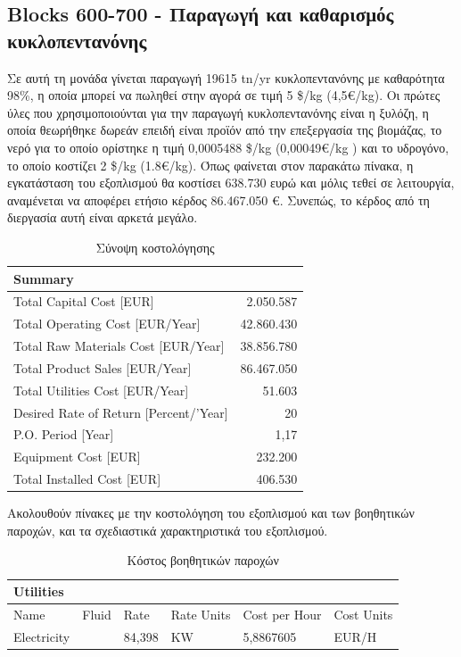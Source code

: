 \documentclass[11pt]{article}
\begin{document}
\subsection{Blocks 600-700 - Παραγωγή και καθαρισμός κυκλοπεντανόνης}
\label{sec:orgf728b70}
Σε αυτή τη μονάδα γίνεται παραγωγή 19615 tn/yr κυκλοπεντανόνης με
καθαρότητα 98\%, η οποία μπορεί να πωληθεί στην αγορά σε τιμή 5 \$/kg
(4,5€/kg). Οι πρώτες ύλες που χρησιμοποιούνται για την παραγωγή
κυκλοπεντανόνης είναι η ξυλόζη, η οποία θεωρήθηκε δωρεάν επειδή είναι
προϊόν από την επεξεργασία της βιομάζας, το νερό για το οποίο ορίστηκε η
τιμή 0,0005488 \$/kg (0,00049€/kg ) και το υδρογόνο, το οποίο κοστίζει 2
\$/kg (1.8€/kg). Όπως φαίνεται στον παρακάτω πίνακα, η εγκατάσταση του
εξοπλισμού θα κοστίσει 638.730 ευρώ και μόλις τεθεί σε λειτουργία,
αναμένεται να αποφέρει ετήσιο κέρδος 86.467.050 €. Συνεπώς, το κέρδος
από τη διεργασία αυτή είναι αρκετά μεγάλο.

\begin{table}[htbp]
\caption{Σύνοψη κοστολόγησης}
\centering
\begin{tabular}{lr}
Summary & \\
\hline
Total Capital Cost [EUR] & 2.050.587\\
Total Operating Cost [EUR/Year] & 42.860.430\\
Total Raw Materials Cost [EUR/Year] & 38.856.780\\
Total Product Sales [EUR/Year] & 86.467.050\\
Total Utilities Cost [EUR/Year] & 51.603\\
Desired Rate of Return [Percent/'Year] & 20\\
P.O. Period [Year] & 1,17\\
Equipment Cost [EUR] & 232.200\\
Total Installed Cost [EUR] & 406.530\\
\end{tabular}
\end{table}

Ακολουθούν πίνακες με την κοστολόγηση του εξοπλισμού και των βοηθητικών
παροχών, και τα σχεδιαστικά χαρακτηριστικά του εξοπλισμού.

\begin{table}[htbp]
\caption{Κόστος βοηθητικών παροχών}
\centering
\begin{tabular}{llllll}
Utilities &  &  &  &  & \\
\hline
Name & Fluid & Rate & Rate Units & Cost per Hour & Cost Units\\
Electricity &   & 84,398 & KW & 5,8867605 & EUR/H\\
\end{tabular}
\end{table}
\end{document}
